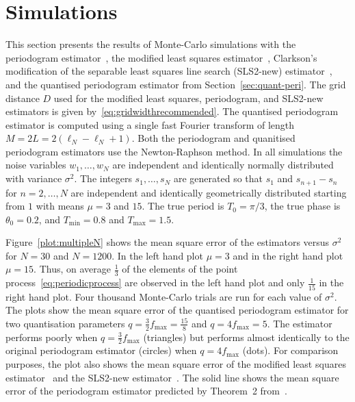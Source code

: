 \documentclass[10pt,twocolumn,twoside]{IEEEtran}
\begin{document}
\section{Simulations} \label{sec:simulations} 

This section presents the results of Monte-Carlo simulations with the periodogram estimator~\cite{Haohuan2013435,Fogel1989_bit_synch_zero_crossings}, the modified least squares estimator~\cite{Clarkson2007,McKilliam2007}, Clarkson's modification of the separable least squares line search (SLS2-new) estimator~\cite{Clarkson2007,Sidiropoulos2005}, and the quantised periodogram estimator from Section~\ref{sec:quant-peri}.  The grid distance $D$ used for the modified least squares, periodogram, and SLS2-new estimators is given by~\eqref{eq:gridwidthrecommended}.  The quantised periodogram estimator is computed using a single fast Fourier transform of length $M = 2L = 2(\ell_N - \ell_N + 1)$.  Both the periodogram and quanitised periodogram estimators use the Newton-Raphson method.  In all simulations the noise variables $w_1,\dots,w_N$ are independent and identically normally distributed with variance $\sigma^2$.  The integers $s_1,\dots,s_N$ are generated so that $s_1$ and $s_{n+1} - s_n$ for $n=2,\dots,N$ are independent and identically geometrically distributed starting from $1$ with means $\mu=3$ and $15$.  The true period is $T_0 = \pi/3$, the true phase is $\theta_0 = 0.2$, and $T_{\text{min}} = 0.8$ and $T_{\text{max}} = 1.5$.

Figure~\ref{plot:multipleN} shows the mean square error of the estimators versus $\sigma^2$ for $N = 30$ and $N = 1200$.  In the left hand  plot $\mu=3$ and in the right hand plot $\mu=15$.  Thus, on average $\tfrac{1}{3}$ of the elements of the point process~\eqref{eq:periodicprocess} are observed in the left hand  plot and only $\tfrac{1}{15}$ in the right hand plot.  Four thousand Monte-Carlo trials are run for each value of $\sigma^2$.  The plots show the mean square error of the quantised periodogram estimator for two quantisation parameters $q = \tfrac{3}{2}f_{\text{max}} = \tfrac{15}{8}$ and $q = 4 f_{\text{max}} = 5$.  The estimator performs poorly when $q = \tfrac{3}{2}f_{\text{max}}$ (triangles) but performs almost identically to the original periodogram estimator (circles) when $q = 4 f_{\text{max}}$ (dots).  For comparison purposes, the plot also shows the mean square error of the modified least squares estimator~\cite{Clarkson2007,McKilliam2007} and the SLS2-new estimator~\cite{Clarkson2007,Sidiropoulos2005}.  %
The solid line shows the mean square error of the periodogram estimator predicted by Theorem~2 from~\cite{Quinn20013asilomar_period_est}.
\end{document}
